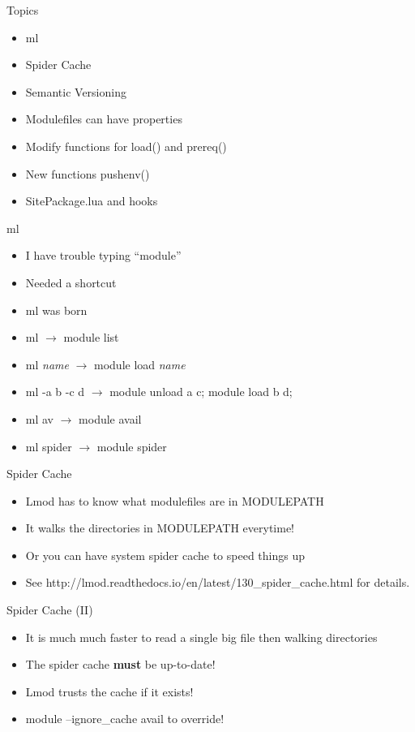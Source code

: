 \documentclass[dvipsnames,aspectratio=169]{beamer}
\begin{document}
\begin{frame}{Topics}
  \begin{itemize}
    \item ml 
    \item Spider Cache
    \item Semantic Versioning
    \item Modulefiles can have properties
    \item Modify functions for load() and prereq()
    \item New functions pushenv()
    \item SitePackage.lua and hooks
  \end{itemize}
\end{frame}

\begin{frame}{ml}
  \begin{itemize}
    \item I have trouble typing ``module''
    \item Needed a shortcut
    \item ml was born
    \item ml $\rightarrow$ module list
    \item ml \emph{name} $\rightarrow$ module load \emph{name}
    \item ml -a b -c d $\rightarrow$ module unload a c; module load b d; 
    \item ml av $\rightarrow$ module avail
    \item ml spider $\rightarrow$ module spider
  \end{itemize}
\end{frame}

\begin{frame}{Spider Cache}
  \begin{itemize}
    \item Lmod has to know what modulefiles are in MODULEPATH
    \item It walks the directories in MODULEPATH everytime!
    \item Or you can have system spider cache to speed things up
    \item See
      http://lmod.readthedocs.io/en/latest/130\_spider\_cache.html for
      details.
  \end{itemize}
\end{frame}

\begin{frame}{Spider Cache (II)}
  \begin{itemize}
    \item It is much much faster to read a single big file then
      walking directories
    \item The spider cache \textbf{must} be up-to-date!
    \item Lmod trusts the cache if it exists!
    \item module --ignore\_cache avail to override!
  \end{itemize}
\end{frame}
\end{document}
